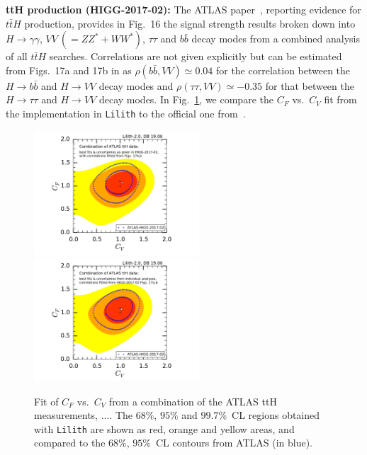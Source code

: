 {\bf\boldmath ttH production (HIGG-2017-02):} The ATLAS paper~\cite{Aaboud:2017jvq}, reporting evidence for $t\bar tH$ production,  
provides in Fig.~16 the signal strength results broken down into $H\to \gamma\gamma$, $VV~(=ZZ^*+WW^*)$, $\tau\tau$ and $b\bar b$ 
decay modes from a combined analysis of all $t\bar tH$ searches.  
Correlations are not given explicitly but can be estimated from %
Figs.~17a and 17b in \cite{Aaboud:2017jvq} 
as $\rho(b\bar b, VV)\simeq 0.04$ for the correlation between the $H\to b\bar b$ and $H\to VV$ decay modes
and $\rho(\tau\tau, VV)\simeq -0.35$ for that between the $H\to \tau\tau$ and $H\to VV$ decay modes. 
In Fig.~\ref{fig:validation_atlas_ttH}, we compare the $C_F$ vs.\ $C_V$ fit from the implementation in {\tt Lilith} 
to the official one from~\cite{Aaboud:2017jvq}. 

\begin{figure}[htb!]\centering
\includegraphics[width=0.55\textwidth]{validation/ATLAS/HIGG-2017-02-CVCF-off-corr.pdf}%
\hspace{-16mm}\includegraphics[width=0.55\textwidth]{validation/ATLAS/HIGG-2017-02-CVCF-fit-corr.pdf}%
\vspace*{-2mm}
\caption{Fit of $C_F$ vs.\ $C_V$ from a combination of the ATLAS ttH measurements, ....
The  $68\%$,  $95\%$ and $99.7\%$~CL regions obtained with {\tt Lilith} are shown as red, orange and yellow areas, 
and compared to the $68\%$,  $95\%$~CL contours from ATLAS (in blue).}
\label{fig:validation_atlas_ttH}
\end{figure}

